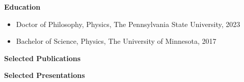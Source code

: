 
\textbf{Education}
\begin{itemize}
    \item Doctor of Philosophy, Physics, The Pennsylvania State University, 2023
    \item Bachelor of Science, Physics, The University of Minnesota, 2017
\end{itemize}

\textbf{Selected Publications}

\textbf{Selected Presentations}

